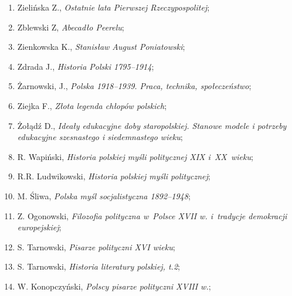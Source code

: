 \documentclass[a4paper,11pt]{article}
\begin{document}
\begin{enumerate}
\item Zielińska Z., \textit{Ostatnie lata Pierwszej Rzeczypospolitej};



\item Zblewski Z, \textit{Abecadło Peerelu};



\item Zienkowska K., \textit{Stanisław August Poniatowski};



\item Zdrada J., \textit{Historia Polski 1795--1914};



\item Żarnowski, J., \textit{Polska 1918--1939. Praca, technika,
    społeczeństwo};



\item Ziejka F., \textit{Złota legenda chłopów polskich};



\item Żołądź D., \textit{Ideały edukacyjne doby staropolskiej. Stanowe
    modele i potrzeby edukacyjne szesnastego i siedemnastego wieku};



\item R. Wapiński, \textit{Historia polskiej myśli politycznej XIX
    i~XX~wieku};



\item R.R. Ludwikowski, \textit{Historia polskiej myśli politycznej};



\item M. Śliwa, \textit{Polska myśl socjalistyczna 1892--1948};



\item Z. Ogonowski, \textit{Filozofia polityczna w~Polsce XVII w.
    i~tradycje demokracji europejskiej};



\item S. Tarnowski, \textit{Pisarze polityczni XVI wieku};



\item S. Tarnowski, \textit{Historia literatury polskiej, t.2};



\item W. Konopczyński, \textit{Polscy pisarze polityczni XVIII w.};




\end{enumerate}
\end{document}
